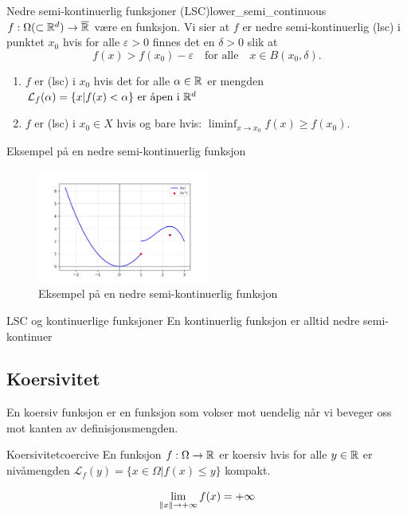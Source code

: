 \begin{definition}{Nedre semi-kontinuerlig funksjoner (LSC)}{lower_semi_continuous}
	\(f: \Omega (\subset \mathbb{R}^d) \to \overline{\mathbb{R}}\) være en funksjon. Vi sier at \(f\) er nedre semi-kontinuerlig (lsc) i punktet \(x_0\) hvis for alle \(\varepsilon > 0\) finnes det en \(\delta > 0\) slik at
	\[
		f(x) > f(x_0) - \varepsilon \quad \text{for alle} \quad x \in B(x_0, \delta).
	\]
	\begin{enumerate}
		\item \(f\) er (lsc) i \(x_0\) hvis det for alle \(\alpha \in \mathbb{R}\) er mengden \(\mathcal{L}_f(\alpha) = \{x | f(x) < \alpha \} \text{ er åpen i } \mathbb{R}^d\)
		\item \(f\) er (lsc) i \(x_0 \in X\) hvis og bare hvis: \(\liminf_{x \to x_0} f(x) \geq f(x_0)\).
	\end{enumerate}
\end{definition}
\begin{example}{Eksempel på en nedre semi-kontinuerlig funksjon}{}
	\begin{figure}[H]
		\centering
		\includegraphics[width=0.5\textwidth]{figures/example_lsc.png}
		\caption{Eksempel på en nedre semi-kontinuerlig funksjon}
	\end{figure}
\end{example}
\begin{remark}{LSC og kontinuerlige funksjoner}{}
	En kontinuerlig funksjon er alltid nedre semi-kontinuer
\end{remark}

\subsection{Koersivitet}
En koersiv funksjon er en funksjon som vokser mot uendelig når vi beveger oss mot kanten av definisjonsmengden.
\begin{definition}{Koersivitet}{coercive}
	En funksjon \(f: \Omega \to \mathbb{R}\) er koersiv hvis for alle \(y \in \mathbb{R}\) er nivåmengden \(\mathcal{L}_f(y) = \{x \in \Omega | f(x) \leq y\}\) kompakt.

	\[
		\lim_{\lVert x\rVert \to +\infty} f(x) = +\infty
	\]
\end{definition}

